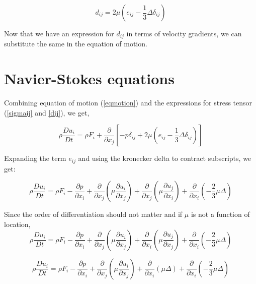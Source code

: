 \begin{equation}
\label{dij}
d_{ij} = 2 \mu \left( e_{ij} - \frac{1}{3} \Delta \delta_{ij} \right)
\end{equation} 


Now that we have an expression for $d_{ij}$ in terms of velocity gradients, we can substitute the same in the equation of motion.

\section{Navier-Stokes equations}


Combining equation of motion (\ref{eqmotion}) and the expressions for stress tensor (\ref{sigmaij} and \ref{dij}), we get,

\begin{equation}
\rho \frac{Du_i}{Dt} = \rho F_i + \frac{\partial}{\partial x_j} \left[ -p\delta_{ij}+ 2 \mu \left( e_{ij} - \frac{1}{3} \Delta \delta_{ij}\right)\right]
\end{equation} 

Expanding the term $e_{ij}$ and using the kronecker delta to contract subscripts, we get:

\begin{equation}
\rho \frac{Du_i}{Dt} = \rho F_i -  \frac{\partial p}{\partial x_i} +  
\frac{\partial}{\partial x_j} \left( \mu \frac{\partial u_i}{\partial x_j} \right) + 
\frac{\partial}{\partial x_j} \left( \mu \frac{\partial u_j}{\partial x_i} \right) + 
\frac{\partial}{\partial x_i} \left( -\frac{2}{3} \mu \Delta \right) 
\end{equation} 

Since the order of differentiation should not matter and if $\mu$ is not a function of location,
\begin{equation}
\rho \frac{Du_i}{Dt} = \rho F_i -  \frac{\partial p}{\partial x_i} +  
\frac{\partial}{\partial x_j} \left( \mu \frac{\partial u_i}{\partial x_j} \right) + 
\frac{\partial}{\partial x_i} \left( \mu \frac{\partial u_j}{\partial x_j} \right) + 
\frac{\partial}{\partial x_i} \left( -\frac{2}{3} \mu \Delta \right) 
\end{equation} 

\begin{equation}
\rho \frac{Du_i}{Dt} = \rho F_i -  \frac{\partial p}{\partial x_i} +  
\frac{\partial}{\partial x_j} \left( \mu \frac{\partial u_i}{\partial x_j} \right) + 
\frac{\partial}{\partial x_i} \left( \mu \Delta \right) + 
\frac{\partial}{\partial x_i} \left( -\frac{2}{3} \mu \Delta \right) 
\end{equation} 


